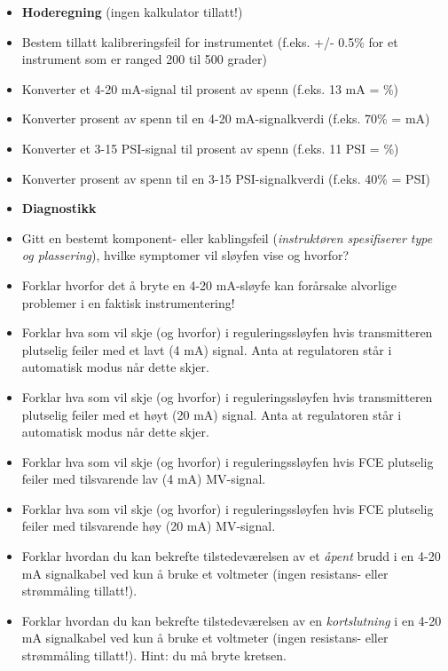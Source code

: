 \filbreak

\begin{itemize}
\item{} {\bf Hoderegning} (ingen kalkulator tillatt!)
\item{} Bestem tillatt kalibreringsfeil for instrumentet (f.eks. +/- 0.5\% for et instrument som er ranged 200 til 500 grader)
\item{} Konverter et 4-20 mA-signal til prosent av spenn (f.eks. 13 mA = \underbar{\hskip 20pt}\%)
\item{} Konverter prosent av spenn til en 4-20 mA-signalkverdi (f.eks. 70\% = \underbar{\hskip 20pt} mA)
\item{} Konverter et 3-15 PSI-signal til prosent av spenn (f.eks. 11 PSI = \underbar{\hskip 20pt}\%)
\item{} Konverter prosent av spenn til en 3-15 PSI-signalkverdi (f.eks. 40\% = \underbar{\hskip 20pt} PSI)
\end{itemize}

\filbreak

\begin{itemize}
\item{} {\bf Diagnostikk}
\item{} Gitt en bestemt komponent- eller kablingsfeil ({\it instruktøren spesifiserer type og plassering}), hvilke symptomer vil sløyfen vise og hvorfor?
\item{} Forklar hvorfor det å bryte en 4-20 mA-sløyfe kan forårsake alvorlige problemer i en faktisk instrumentering!
\item{} Forklar hva som vil skje (og hvorfor) i reguleringssløyfen hvis transmitteren plutselig feiler med et lavt (4 mA) signal.  Anta at regulatoren står i automatisk modus når dette skjer.
\item{} Forklar hva som vil skje (og hvorfor) i reguleringssløyfen hvis transmitteren plutselig feiler med et høyt (20 mA) signal.  Anta at regulatoren står i automatisk modus når dette skjer.
\item{} Forklar hva som vil skje (og hvorfor) i reguleringssløyfen hvis FCE plutselig feiler med tilsvarende lav (4 mA) MV-signal.
\item{} Forklar hva som vil skje (og hvorfor) i reguleringssløyfen hvis FCE plutselig feiler med tilsvarende høy (20 mA) MV-signal.
\item{} Forklar hvordan du kan bekrefte tilstedeværelsen av et {\it åpent} brudd i en 4-20 mA signalkabel ved kun å bruke et voltmeter (ingen resistans- eller strømmåling tillatt!).
\item{} Forklar hvordan du kan bekrefte tilstedeværelsen av en {\it kortslutning} i en 4-20 mA signalkabel ved kun å bruke et voltmeter (ingen resistans- eller strømmåling tillatt!).  Hint: du må bryte kretsen.
\end{itemize}




